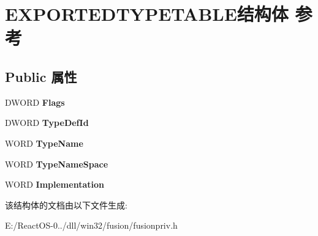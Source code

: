 \hypertarget{struct_e_x_p_o_r_t_e_d_t_y_p_e_t_a_b_l_e}{}\section{E\+X\+P\+O\+R\+T\+E\+D\+T\+Y\+P\+E\+T\+A\+B\+L\+E结构体 参考}
\label{struct_e_x_p_o_r_t_e_d_t_y_p_e_t_a_b_l_e}
\subsection*{Public 属性}
\begin{DoxyCompactItemize}
\item 
\mbox{\label{struct_e_x_p_o_r_t_e_d_t_y_p_e_t_a_b_l_e_a92fd60a2845ab0780598eaa0ddb14981}} 
D\+W\+O\+RD {\bfseries Flags}
\item 
\mbox{\label{struct_e_x_p_o_r_t_e_d_t_y_p_e_t_a_b_l_e_a53cbed10bd338fd0ae8503f6554f8cbb}} 
D\+W\+O\+RD {\bfseries Type\+Def\+Id}
\item 
\mbox{\label{struct_e_x_p_o_r_t_e_d_t_y_p_e_t_a_b_l_e_a30e607a8c7dfb2d02138c482176fdc88}} 
W\+O\+RD {\bfseries Type\+Name}
\item 
\mbox{\label{struct_e_x_p_o_r_t_e_d_t_y_p_e_t_a_b_l_e_adc844d7ff22453421e4043c0cf68e5d9}} 
W\+O\+RD {\bfseries Type\+Name\+Space}
\item 
\mbox{\label{struct_e_x_p_o_r_t_e_d_t_y_p_e_t_a_b_l_e_a7dff46670246076cc3664f5129e1150c}} 
W\+O\+RD {\bfseries Implementation}
\end{DoxyCompactItemize}


该结构体的文档由以下文件生成\+:\begin{DoxyCompactItemize}
\item 
E\+:/\+React\+O\+S-\/0../dll/win32/fusion/fusionpriv.\+h\end{DoxyCompactItemize}

